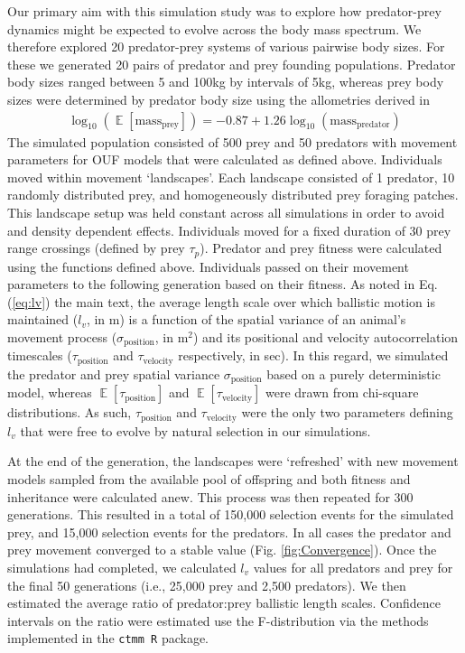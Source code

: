 \documentclass[12pt]{article}
\DeclareMathOperator{\E}{\mathbb{E}}
\begin{document}
Our primary aim with this simulation study was to explore how predator-prey dynamics might be expected to evolve across the body mass spectrum. We therefore explored 20 predator-prey systems of various pairwise body sizes. For these we generated 20 pairs of predator and prey founding populations. Predator body sizes ranged between 5 and 100kg by intervals of 5kg, whereas prey body sizes were determined by predator body size using the allometries derived in \cite{Tucker:2014b} 
\begin{gather}\label{eq:bodymass-sc}
\log_{10}(\E[\mathrm{mass_{prey}}]) = -0.87 + 1.26 \log_{10}(\mathrm{mass_{predator}})
\end{gather}
The simulated population consisted of 500 prey and 50 predators with movement parameters for OUF models that were calculated as defined above. Individuals moved within movement `landscapes'. Each landscape consisted of 1 predator, 10 randomly distributed prey, and homogeneously distributed prey foraging patches. This landscape setup was held constant across all simulations in order to avoid and density dependent effects. Individuals moved for a fixed duration of 30 prey range crossings (defined by prey $\tau_p$). Predator and prey fitness were calculated using the functions defined above. Individuals passed on their movement parameters to the following generation based on their fitness. As noted in Eq. (\ref{eq:lv}) the main text, the average length scale over which ballistic motion is maintained ($l_v$, in m) is a function of the spatial variance of an animal's movement process ($\sigma_{\mathrm{position}}$, in m$^2$) and its positional and velocity autocorrelation timescales ($\tau_{\mathrm{position}}$ and $\tau_\mathrm{velocity}$ respectively, in sec). In this regard, we simulated the predator and prey spatial variance $\sigma_{\mathrm{position}}$ based on a purely deterministic model, whereas $\E[\tau_\mathrm{position}]$ and $\E[\tau_\mathrm{velocity}]$ were drawn from chi-square distributions. As such, $\tau_\mathrm{position}$ and $\tau_\mathrm{velocity}$ were the only two parameters defining $l_v$ that were free to evolve by natural selection in our simulations.

At the end of the generation, the landscapes were `refreshed' with new movement models sampled from the available pool of offspring and both fitness and inheritance were calculated anew. This process was then repeated for 300 generations. This resulted in a total of 150,000 selection events for the simulated prey, and 15,000 selection events for the predators. In all cases the predator and prey movement converged to a stable value (Fig. \ref{fig:Convergence}). Once the simulations had completed, we calculated $l_v$ values for all predators and prey for the final 50 generations (i.e., 25,000 prey and 2,500 predators). We then estimated the average ratio of predator:prey ballistic length scales. Confidence intervals on the ratio were estimated use the F-distribution via the methods implemented in the \texttt{ctmm R} package.
\end{document}
